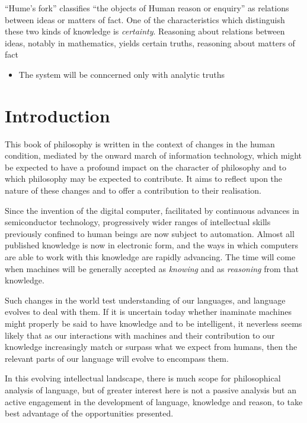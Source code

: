 ``Hume's fork'' classifies ``the objects of Human reason or enquiry'' as relations between ideas or matters of fact.
One of the characteristics which distinguish these two kinds of knowledge is {\it certainty}.
Reasoning about relations between ideas, notably in mathematics, yields certain truths, reasoning about matters of fact 


\begin{itemize}
\item The system will be conncerned only with analytic truths
\end {itemize}

\chapter{Introduction}\label{IntroductionB}

This book of philosophy is written in the context of changes in the human
condition, mediated by the onward march of information technology, which
might be expected to have a profound impact on the character of philosophy
and to which philosophy may be expected to contribute.
It aims to reflect upon the nature of these changes and to offer a contribution
to their realisation.

Since the invention of the digital computer, facilitated by continuous advances
in semiconductor technology, progressively wider ranges of intellectual skills
previously confined to human beings are now subject to automation.
Almost all published knowledge is now in electronic form, and the ways in which
computers are able to work with this knowledge are rapidly advancing.
The time will come when machines will be generally accepted as \emph{knowing}
and as \emph{reasoning} from that knowledge.

Such changes in the world test understanding of our languages, and language
evolves to deal with them.
If it is uncertain today whether inaminate machines might properly be said to
have knowledge and to be intelligent, it neverless seems likely that as our
interactions with machines and their contribution to our knowledge increasingly
match or surpass what we expect from humans, then the relevant parts of our
language will evolve to encompass them.

In this evolving intellectual landscape, there is much scope for philosophical
analysis of language, but of greater interest here is not a passive analysis but
an active engagement in the development of language, knowledge and reason, to take
best advantage of the opportunities presented.

